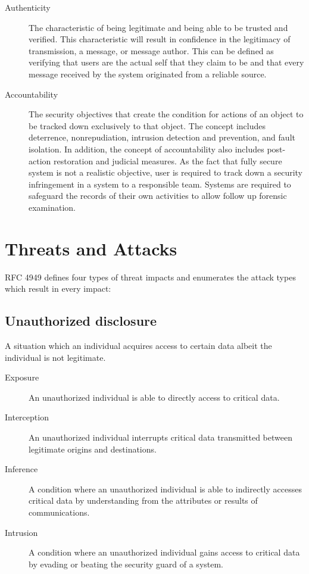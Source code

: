 \documentclass[../index.tex]{subfiles}
\begin{document}
\begin{description}
	\item[Authenticity] The characteristic of being legitimate and being able to be trusted and
		verified. This characteristic will result in confidence in the legitimacy of transmission, a
		message, or message author. This can be defined as verifying that users are the actual self that
		they claim to be and that every message received by the system originated from a reliable
		source.
	\item[Accountability] The security objectives that create the condition for actions of an object
		to be tracked down exclusively to that object. The concept includes deterrence, nonrepudiation,
		intrusion detection and prevention, and fault isolation. In addition, the concept of
		accountability also includes post-action restoration and judicial measures. As the fact that
		fully secure system is not a realistic objective, user is required to track down a security
		infringement in a system to a responsible team. Systems are required to safeguard the records of
		their own activities to allow follow up forensic examination.
\end{description}

\section{Threats and Attacks}

RFC 4949 defines four types of threat impacts and enumerates the attack types which result in every
impact:

\subsection{Unauthorized disclosure}

A situation which an individual acquires access to certain data albeit the individual is not legitimate.

\begin{description}
	\item[Exposure] An unauthorized individual is able to directly access to critical data.
	\item[Interception] An unauthorized individual interrupts critical data transmitted between
		legitimate origins and destinations.
	\item[Inference] A condition where an unauthorized individual is able to indirectly accesses
		critical data by understanding from the attributes or results of communications.
	\item[Intrusion] A condition where an unauthorized individual gains access to critical data by
		evading or beating the security guard of a system.
\end{description}
\end{document}
